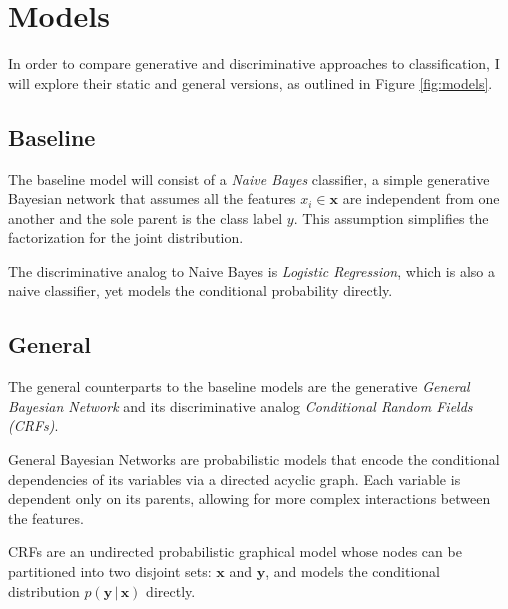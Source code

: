 \documentclass{article}
\begin{document}

\section{Models}
In order to compare generative and discriminative
approaches to classification, I will explore their static and general versions,
as outlined in Figure \ref{fig:models}.

\subsection{Baseline}
The baseline model will consist of a \textit{Naive Bayes} classifier, a simple generative
Bayesian network that assumes all the features $x_i \in \mathbf{x}$ are
independent from one another and the sole parent is the class label $y$. This
assumption simplifies the factorization for the joint distribution.

The discriminative analog to Naive Bayes is \textit{Logistic Regression}, which is
also a naive classifier, yet models the conditional probability directly.

\subsection{General}
The general counterparts to the baseline models are the generative
\textit{General Bayesian Network} and its discriminative analog
\textit{Conditional Random Fields (CRFs)}.

General Bayesian Networks are probabilistic models that
encode the conditional dependencies of its variables via a directed acyclic
graph. Each variable is dependent only on its parents,
allowing for more complex interactions between the features.

CRFs are an undirected probabilistic graphical model whose
nodes can be partitioned into two disjoint sets: $\mathbf{x}$ and $\mathbf{y}$,
and models the conditional distribution $p(\mathbf{y}\, | \, \mathbf{x})$
directly.
\end{document}
